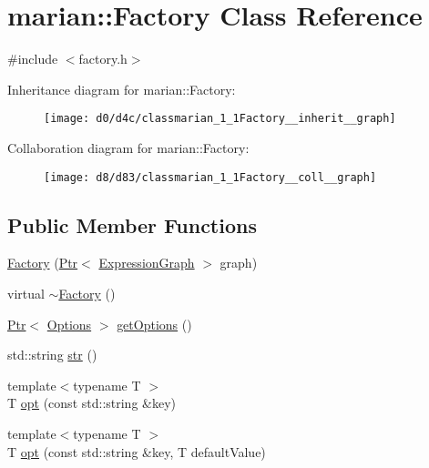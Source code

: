 \hypertarget{classmarian_1_1Factory}{}\section{marian\+:\+:Factory Class Reference}
\label{classmarian_1_1Factory}


{\ttfamily \#include $<$factory.\+h$>$}



Inheritance diagram for marian\+:\+:Factory\+:
\nopagebreak
\begin{figure}[H]
\begin{center}
\leavevmode
\texttt{[image: d0/d4c/classmarian\_1\_1Factory\_\_inherit\_\_graph]}
\end{center}
\end{figure}


Collaboration diagram for marian\+:\+:Factory\+:
\nopagebreak
\begin{figure}[H]
\begin{center}
\leavevmode
\texttt{[image: d8/d83/classmarian\_1\_1Factory\_\_coll\_\_graph]}
\end{center}
\end{figure}
\subsection*{Public Member Functions}
\begin{DoxyCompactItemize}
\item 
\hyperlink{classmarian_1_1Factory_ab6d238f17d2460511087ba73d908c30e}{Factory} (\hyperlink{namespacemarian_ad1a373be43a00ef9ce35666145137b08}{Ptr}$<$ \hyperlink{classmarian_1_1ExpressionGraph}{Expression\+Graph} $>$ graph)
\item 
virtual \hyperlink{classmarian_1_1Factory_a88d85aadc4ff96b0f691ae2c2a738ba1}{$\sim$\+Factory} ()
\item 
\hyperlink{namespacemarian_ad1a373be43a00ef9ce35666145137b08}{Ptr}$<$ \hyperlink{classmarian_1_1Options}{Options} $>$ \hyperlink{classmarian_1_1Factory_af3c6a87f9a9c56c7f62aae0c33c9cde3}{get\+Options} ()
\item 
std\+::string \hyperlink{classmarian_1_1Factory_a9b2a922c487a8798ebbbf1a9bffd5ef2}{str} ()
\item 
{\footnotesize template$<$typename T $>$ }\\T \hyperlink{classmarian_1_1Factory_abc51a49edfa544441e7b187a0176d107}{opt} (const std\+::string \&key)
\item 
{\footnotesize template$<$typename T $>$ }\\T \hyperlink{classmarian_1_1Factory_af818963ee25402cc6ef601d6ed711d19}{opt} (const std\+::string \&key, T default\+Value)
\end{DoxyCompactItemize}
